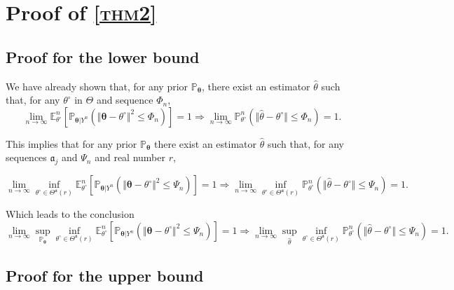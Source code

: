 \section{Proof of \textsc{\cref{thm2}}}
\subsection{Proof for the lower bound}

We have already shown that, for any prior $\mathds{P}_{\boldsymbol{\theta}}$, there exist an estimator $\widehat{\theta}$ such that, for any $\theta^{\circ}$ in $\Theta$ and sequence $\Phi_{n}$,
\[\lim\limits_{n \rightarrow \infty} \mathds{E}_{\theta^{\circ}}^{n} \left[\mathds{P}_{\boldsymbol{\theta}\vert Y^{n} }\left(\Vert \boldsymbol{\theta} - \theta^{\circ} \Vert^{2} \leq \Phi_{n}\right)\right] = 1 \Rightarrow \lim\limits_{n \rightarrow \infty}\mathds{P}_{\theta^{\circ}}^{n}\left(\Vert \widehat{\theta} - \theta^{\circ} \Vert \leq \Phi_{n}\right) = 1.\]

This implies that for any prior $\mathds{P}_{\boldsymbol{\theta}}$ there exist an estimator $\widehat{\theta}$ such that, for any sequences $\mathfrak{a}_{j}$ and $\Psi_{n}$ and real number $r$,

\[\lim\limits_{n \rightarrow \infty} \inf\limits_{\theta^{\circ} \in \Theta^{\mathfrak{a}}(r)} \mathds{E}_{\theta^{\circ}}^{n} \left[\mathds{P}_{\boldsymbol{\theta}\vert Y^{n} }\left(\Vert \boldsymbol{\theta} - \theta^{\circ} \Vert^{2} \leq \Psi_{n}\right)\right] = 1 \Rightarrow \lim\limits_{n \rightarrow \infty} \inf\limits_{\theta^{\circ} \in \Theta^{\mathfrak{a}}(r)}\mathds{P}_{\theta^{\circ}}^{n}\left(\Vert \widehat{\theta} - \theta^{\circ} \Vert \leq \Psi_{n}\right) = 1.\]

Which leads to the conclusion
\[\lim\limits_{n \rightarrow \infty} \sup\limits_{\mathds{P}_{\boldsymbol{\theta}}} \inf\limits_{\theta^{\circ} \in \Theta^{\mathfrak{a}}(r)} \mathds{E}_{\theta^{\circ}}^{n} \left[\mathds{P}_{\boldsymbol{\theta}\vert Y^{n} }\left(\Vert \boldsymbol{\theta} - \theta^{\circ} \Vert^{2} \leq \Psi_{n}\right)\right] = 1 \Rightarrow \lim\limits_{n \rightarrow \infty} \sup\limits_{\widehat{\theta}} \inf\limits_{\theta^{\circ} \in \Theta^{\mathfrak{a}}(r)}\mathds{P}_{\theta^{\circ}}^{n}\left(\Vert \widehat{\theta} - \theta^{\circ} \Vert \leq \Psi_{n}\right) = 1.\]

\subsection{Proof for the upper bound}

